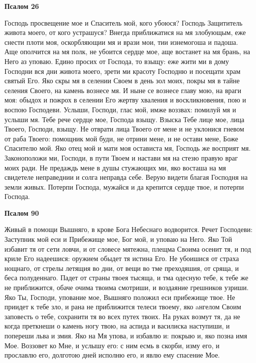 \medskip


\bfseries Псалом 26\normalfont{}


Господь просвещение мое и Спаситель мой, кого убоюся? Господь Защититель живота моего, от кого устрашуся? Внегда приближатися на мя злобующым, еже снести плоти моя, оскорбляющии мя и врази мои, тии изнемогоша и падоша. Аще ополчится на мя полк, не убоится сердце мое, аще востанет на мя брань, на Него аз уповаю. Едино просих от Господа, то взыщу: еже жити ми в дому Господни вся дни живота моего, зрети ми красоту Господню и посещати храм святый Его. Яко скры мя в селении Своем в день зол моих, покры мя в тайне селения Своего, на камень вознесе мя. И ныне се вознесе главу мою, на враги моя: обыдох и пожрох в селении Его жертву хваления и воскликновения, пою и воспою Господеви. Услыши, Господи, глас мой, имже воззвах: помилуй мя и услыши мя. Тебе рече сердце мое, Господа взыщу. Взыска Тебе лице мое, лица Твоего, Господи, взыщу. Не отврати лица Твоего от мене и не уклонися гневом от раба Твоего: помощник мой буди, не отрини мене, и не остави мене, Боже Спасителю мой. Яко отец мой и мати моя остависта мя, Господь же восприят мя. Законоположи ми, Господи, в пути Твоем и настави мя на стезю правую враг моих ради. Не предаждь мене в душы стужающих ми, яко восташа на мя свидетеле неправеднии и солга неправда себе. Верую видети благая Господня на земли живых. Потерпи Господа, мужайся и да крепится сердце твое, и потерпи Господа.


\medskip


\bfseries Псалом 90\normalfont{}


Живый в помощи Вышняго, в крове Бога Небеснаго водворится. Речет Господеви: Заступник мой еси и Прибежище мое, Бог мой, и уповаю на Него. Яко Той избавит тя от сети ловчи, и от словесе мятежна, плещма Своима осенит тя, и под криле Его надеешися: оружием обыдет тя истина Его. Не убоишися от страха нощнаго, от стрелы летящия во дни, от вещи во тме преходяшия, от сряща, и беса полуденнаго. Падет от страны твоея тысяща, и тма одесную тебе, к тебе же не приближится, обаче очима твоима смотриши, и воздаяние грешников узриши. Яко Ты, Господи, упование мое, Вышняго положил еси прибежище твое. Не приидет к тебе зло, и рана не приближится телеси твоему, яко aнгелом Своим заповесть о тебе, сохранити тя во всех путех твоих. На руках возмут тя, да не когда преткнеши о камень ногу твою, на аспида и василиска наступиши, и попереши льва и змия. Яко на Мя упова, и избавлю и: покрыю и, яко позна имя Мое. Воззовет ко Мне, и услышу его: с ним есмь в скорби, изму его, и прославлю его, долготою дней исполню его, и явлю ему спасение Мое.


